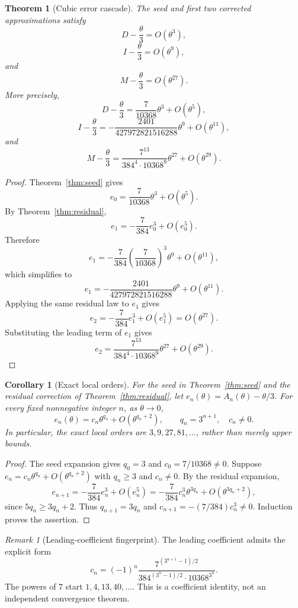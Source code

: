 \documentclass[11pt]{article}
\newtheorem{theorem}{Theorem}
\newtheorem{corollary}{Corollary}
\theoremstyle{remark}
\newtheorem{remark}{Remark}
\begin{document}
\begin{theorem}[Cubic error cascade]\label{thm:cascade}
The seed and first two corrected approximations satisfy
\[
D-\frac{\theta}{3}=O(\theta^3),
\]
\[
I-\frac{\theta}{3}=O(\theta^9),
\]
and
\[
M-\frac{\theta}{3}=O(\theta^{27}).
\]
More precisely,
\[
D-\frac{\theta}{3}
=
\frac{7}{10368}\theta^3+O(\theta^5),
\]
\[
I-\frac{\theta}{3}
=
-
\frac{2401}{427972821516288}\theta^9
+
O(\theta^{11}),
\]
and
\[
M-\frac{\theta}{3}
=
\frac{7^{13}}{384^4\cdot 10368^9}\theta^{27}
+
O(\theta^{29}).
\]
\end{theorem}

\begin{proof}
Theorem~\ref{thm:seed} gives
\[
e_0
=
\frac{7}{10368}\theta^3+O(\theta^5).
\]
By Theorem~\ref{thm:residual},
\[
e_1
=
-\frac{7}{384}e_0^3+O(e_0^5).
\]
Therefore
\[
e_1
=
-\frac{7}{384}\left(\frac{7}{10368}\right)^3\theta^9
+
O(\theta^{11}),
\]
which simplifies to
\[
e_1
=
-
\frac{2401}{427972821516288}\theta^9
+
O(\theta^{11}).
\]
Applying the same residual law to $e_1$ gives
\[
e_2
=
-\frac{7}{384}e_1^3+O(e_1^5)
=
O(\theta^{27}).
\]
Substituting the leading term of $e_1$ gives
\[
e_2
=
\frac{7^{13}}{384^4\cdot 10368^9}\theta^{27}
+
O(\theta^{29}).
\]
\end{proof}

\begin{corollary}[Exact local orders]\label{cor:exact-orders}
For the seed in Theorem~\ref{thm:seed} and the residual
correction of Theorem~\ref{thm:residual}, let $e_n(\theta)=A_n(\theta)-\theta/3$.
For every fixed nonnegative integer $n$, as $\theta\to0$,
\[
e_n(\theta)=c_n\theta^{q_n}+O(\theta^{q_n+2}),
\qquad q_n=3^{n+1},\quad c_n\ne0.
\]
In particular, the \emph{exact} local orders are
$3,9,27,81,\ldots$, rather than merely upper bounds.
\end{corollary}
\begin{proof}
The seed expansion gives $q_0=3$ and $c_0=7/10368\ne0$.
Suppose $e_n=c_n\theta^{q_n}+O(\theta^{q_n+2})$ with
$q_n\ge3$ and $c_n\ne0$. By the residual expansion,
\[
e_{n+1}=-\frac7{384}e_n^3+O(e_n^5)
= -\frac7{384}c_n^3\theta^{3q_n}
   +O(\theta^{3q_n+2}),
\]
since $5q_n\ge3q_n+2$. Thus $q_{n+1}=3q_n$ and
$c_{n+1}=-(7/384)c_n^3\ne0$. Induction proves the assertion.
\end{proof}
\begin{remark}[Leading-coefficient fingerprint]
The leading coefficient admits the explicit form
\[
c_n=(-1)^n\frac{7^{(3^{n+1}-1)/2}}
{384^{(3^n-1)/2}\cdot 10368^{3^n}}.
\]
The powers of $7$ start $1,4,13,40,\ldots$. This is a
coefficient identity, not an independent convergence theorem.
\end{remark}
\end{document}
